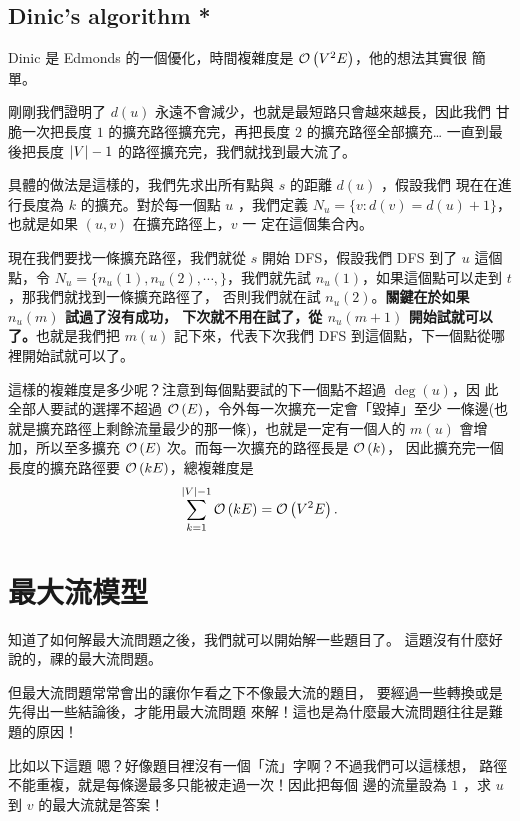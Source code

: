 \documentclass[a4paper,12pt]{book}
\begin{document}
\subsection{Dinic's algorithm *}
Dinic 是 Edmonds 的一個優化，時間複雜度是 $\operatorname{\mathcal{O}}\left(V^2 E\right)$，他的想法其實很
簡單。

剛剛我們證明了 $d(u)$ 永遠不會減少，也就是最短路只會越來越長，因此我們
甘脆一次把長度 $1$ 的擴充路徑擴充完，再把長度 $2$ 的擴充路徑全部擴充…
一直到最後把長度 $\lvert V \rvert - 1$ 的路徑擴充完，我們就找到最大流了。

具體的做法是這樣的，我們先求出所有點與 $s$ 的距離 $d(u)$ ，假設我們
現在在進行長度為 $k$ 的擴充。對於每一個點 $u$ ，我們定義 $N_u = 
\{ v: d(v) = d(u) + 1 \}$，也就是如果 $(u, v)$ 在擴充路徑上，$v$ 一
定在這個集合內。 

現在我們要找一條擴充路徑，我們就從 $s$ 開始 DFS，假設我們 DFS 到了
$u$ 這個點，令 $N_u = \{ n_u(1), n_u(2), \cdots, \}$，我們就先試
$n_u(1)$，如果這個點可以走到 $t$，那我們就找到一條擴充路徑了，
否則我們就在試 $n_u(2)$。{\bf 關鍵在於如果 $n_u(m)$ 試過了沒有成功，
下次就不用在試了，從 $n_u(m+1)$ 開始試就可以了。}也就是我們把 $m(u)$
記下來，代表下次我們 DFS 到這個點，下一個點從哪裡開始試就可以了。

這樣的複雜度是多少呢？注意到每個點要試的下一個點不超過 $\deg(u)$，因
此全部人要試的選擇不超過 $\operatorname{\mathcal{O}}\left(E\right)$，令外每一次擴充一定會「毀掉」至少
一條邊(也就是擴充路徑上剩餘流量最少的那一條)，也就是一定有一個人的
$m(u)$ 會增加，所以至多擴充 $\operatorname{\mathcal{O}}\left(E\right)$ 次。而每一次擴充的路徑長是 $\operatorname{\mathcal{O}}\left(k\right)$，
因此擴充完一個長度的擴充路徑要 $\operatorname{\mathcal{O}}\left(kE\right)$，總複雜度是
\[ \sum_{k = 1}^{\lvert V \rvert-1} \operatorname{\mathcal{O}}\left(kE\right) = \operatorname{\mathcal{O}}\left(V^2 E\right). \] 


\section{最大流模型}
知道了如何解最大流問題之後，我們就可以開始解一些題目了。
這題沒有什麼好說的，祼的最大流問題。 

但最大流問題常常會出的讓你乍看之下不像最大流的題目，
要經過一些轉換或是先得出一些結論後，才能用最大流問題
來解！這也是為什麼最大流問題往往是難題的原因！

比如以下這題
嗯？好像題目裡沒有一個「流」字啊？不過我們可以這樣想，
路徑不能重複，就是每條邊最多只能被走過一次！因此把每個
邊的流量設為 $1$ ，求 $u$ 到 $v$ 的最大流就是答案！
\end{document}
